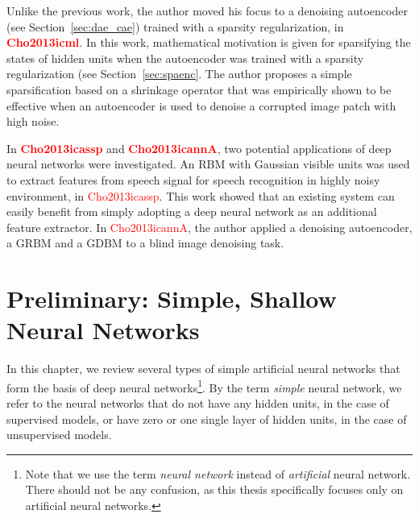 \documentclass{now}
\newcommand{\alert}[1]{\textcolor{red}{#1}}
\newcommand{\citepub}[1]{\alert{#1}}
\begin{document}
Unlike the previous work, the author moved his focus to a
denoising autoencoder (see Section~\ref{sec:dae_cae})
trained with a sparsity regularization, in
\textbf{\citepub{Cho2013icml}}. In this work, mathematical motivation
is given for sparsifying the states of hidden units when the
autoencoder was trained with a sparsity regularization (see
Section~\ref{sec:spaenc}. The
author proposes a simple sparsification based on a shrinkage
operator that was empirically shown to be effective when an
autoencoder is used to denoise a corrupted image patch with
high noise.


In \textbf{\citepub{Cho2013icassp}} and
\textbf{\citepub{Cho2013icannA}}, two potential applications
of deep neural networks were investigated. An RBM with
Gaussian visible units was used to extract features from
speech signal for speech recognition in highly noisy
environment, in \citepub{Cho2013icassp}. This work showed
that an existing system can easily benefit from simply
adopting a deep neural network as an additional feature
extractor. In \citepub{Cho2013icannA}, the author applied a
denoising autoencoder, a GRBM and a GDBM to a blind image
denoising task.












\chapter{Preliminary: Simple, Shallow Neural Networks}
\label{chapter:simple_neural_networks}

In this chapter, we review several types of simple
artificial neural networks that form the basis of deep
neural networks\footnote{Note that we use the term
\textit{neural network} instead of \textit{artificial}
neural network.  There should not be any confusion, as this
thesis specifically focuses only on artificial neural
networks.}. By the term \textit{simple} neural network, we
refer to the neural networks that do not have any hidden
units, in the case of supervised models, or have zero or one
single layer of hidden units, in the case of unsupervised
models.
\end{document}
